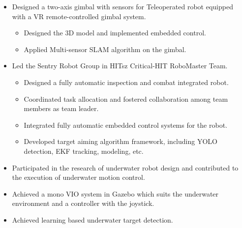 \documentclass[11pt,a4paper]{moderncv}        %
\begin{document}
{\begin{itemize}
\begin{itemize}
\end{itemize}
\item Designed a two-axis gimbal with sensors for Teleoperated robot equipped with a VR remote-controlled gimbal system.
\begin{itemize}%
\item Designed the 3D model and implemented embedded control.
\item Applied Multi-sensor SLAM algorithm on the gimbal.  
\end{itemize}
\end{itemize}
}

%
{
\begin{itemize}%
\item Led the Sentry Robot Group in HITsz Critical-HIT RoboMaster Team.
\begin{itemize}
\item Designed a fully automatic inspection and combat integrated robot.
\item Coordinated task allocation and fostered collaboration among team members as team leader.
\item Integrated fully automatic embedded control systems for the robot. 
\item Developed target aiming algorithm framework, including YOLO detection, EKF tracking, modeling, etc.
\end{itemize}
\end{itemize}
}

%
{
\begin{itemize}%
    \item Participated in the research of underwater robot design and contributed to the execution of underwater motion control.
    \item Achieved a mono VIO system in Gazebo which suits the underwater environment and a controller with the joystick.
    \item Achieved learning based underwater target detection.
\end{itemize}
}
\end{document}
